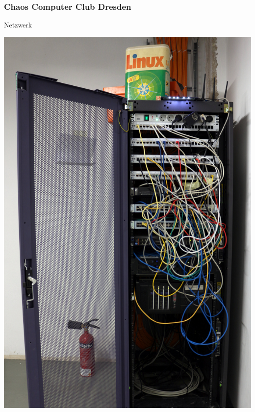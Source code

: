 \documentclass[12pt]{beamer}
\begin{document}
\begin{frame}	
	\frametitle{Chaos Computer Club Dresden}
	\begin{center}
		Netzwerk
		\vspace{0.4cm}

		\includegraphics[height=0.6\textheight]{img/rack.jpg}
	\end{center}
\end{frame}	
\end{document}

